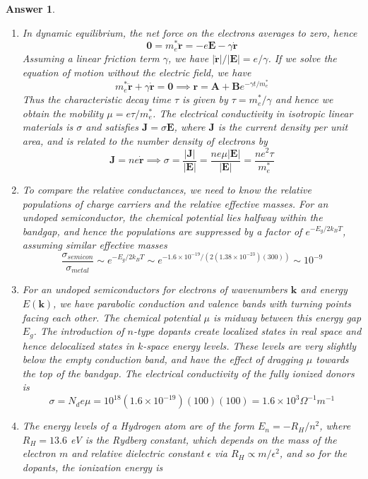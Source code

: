 \documentclass[a4paper]{article}
\newtheorem{ans}{Answer}[subsection]
\theoremstyle{new}
\begin{document}
\begin{ans}\leavevmode
\begin{enumerate}[label=(\roman*)]
\item In dynamic equilibrium, the net force on the electrons averages to zero, hence
$$\boldsymbol{0}=m_e^*\mathbf{\ddot{r}}=-e\mathbf{E}-\gamma\mathbf{\dot{r}}$$
Assuming a linear friction term $\gamma$, we have $|\mathbf{\dot{r}}|/|\mathbf{E}|=e/\gamma$. If we solve the equation of motion without the electric field, we have 
$$m_e^*\mathbf{\ddot{r}}+\gamma\mathbf{\dot{r}}=\boldsymbol{0}\implies\mathbf{r}=\mathbf{A}+\mathbf{B}e^{-\gamma t/m_e^*}$$
Thus the characteristic decay time $\tau$ is given by $\tau=m_e^*/\gamma$ and hence we obtain the mobility $\mu=e\tau/m_e^*$. The electrical conductivity in isotropic linear materials is $\sigma$ and satisfies $\mathbf{J}=\sigma\mathbf{E}$, where $\mathbf{J}$ is the current density per unit area, and is related to the number density of electrons by
$$\mathbf{J}=ne\mathbf{\dot{r}}\implies\sigma=\frac{|\mathbf{J}|}{|\mathbf{E}|}=\frac{ne\mu|\mathbf{E}|}{|\mathbf{E}|}=\frac{ne^2\tau}{m_e^*}$$
\item To compare the relative conductances, we need to know the relative populations of charge carriers and the relative effective masses. For an undoped semiconductor, the chemical potential lies halfway within the bandgap, and hence the populations are suppressed by a factor of $e^{-E_g/2k_BT}$, assuming similar effective masses
$$\frac{\sigma_{semicon}}{\sigma_{metal}}\sim e^{-E_g/2k_BT}\sim e^{-1.6\times10^{-19}/(2(1.38\times10^{-23})(300))}\sim 10^{-9}$$
\item For an undoped semiconductors for electrons of wavenumbers $\mathbf{k}$ and energy $E(\mathbf{k})$, we have parabolic conduction and valence bands with turning points facing each other. The chemical potential $\mu$ is midway between this energy gap $E_g$. The introduction of $n$-type dopants create localized states in real space and hence delocalized states in $k$-space energy levels. These levels are very slightly below the empty conduction band, and have the effect of dragging $\mu$ towards the top of the bandgap. The electrical conductivity of the fully ionized donors is
$$\sigma=N_de\mu=10^{18}(1.6\times10^{-19})(100)(100)=1.6\times10^3\Omega^{-1}m^{-1}$$
\item The energy levels of a Hydrogen atom are of the form $E_n=-R_H/n^2$, where $R_H=13.6$ eV is the Rydberg constant, which depends on the mass of the electron $m$ and relative dielectric constant $\epsilon$ via $R_H\propto m/\epsilon^2$, and so for the dopants, the ionization energy is

\end{enumerate}
\end{ans}
\end{document}
